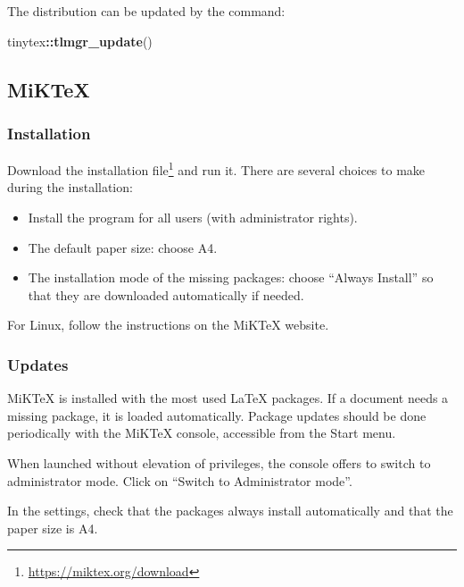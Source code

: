 \documentclass[
  12pt,
  american,
  a4paper,
  extrafontsizes,onecolumn,openright
  ]{memoir}
\newenvironment{Shaded}{\begin{snugshade}}{\end{snugshade}}
\newcommand{\FunctionTok}[1]{\textcolor[rgb]{0.13,0.29,0.53}{\textbf{#1}}}
\newcommand{\NormalTok}[1]{#1}
\newcommand{\SpecialCharTok}[1]{\textcolor[rgb]{0.81,0.36,0.00}{\textbf{#1}}}
\providecommand{\tightlist}{%
  \setlength{\itemsep}{0pt}\setlength{\parskip}{0pt}}
\begin{document}
The distribution can be updated by the command:

\scriptsize

\begin{Shaded}
\begin{Highlighting}[]
\NormalTok{tinytex}\SpecialCharTok{::}\FunctionTok{tlmgr\_update}\NormalTok{()}
\end{Highlighting}
\end{Shaded}

\normalsize

\subsection{MiKTeX}\label{miktex}

\subsubsection{Installation}\label{installation-2}

Download the installation file\footnote{\url{https://miktex.org/download}} and run it.
There are several choices to make during the installation:

\begin{itemize}
\tightlist
\item
  Install the program for all users (with administrator rights).
\item
  The default paper size: choose A4.
\item
  The installation mode of the missing packages: choose \enquote{Always Install} so that they are downloaded automatically if needed.
\end{itemize}

For Linux, follow the instructions on the MiKTeX website.

\subsubsection{Updates}\label{updates}

MiKTeX is installed with the most used LaTeX packages.
If a document needs a missing package, it is loaded automatically.
Package updates should be done periodically with the MiKTeX console, accessible from the Start menu.

When launched without elevation of privileges, the console offers to switch to administrator mode.
Click on \enquote{Switch to Administrator mode}.

In the settings, check that the packages always install automatically and that the paper size is A4.
\end{document}
